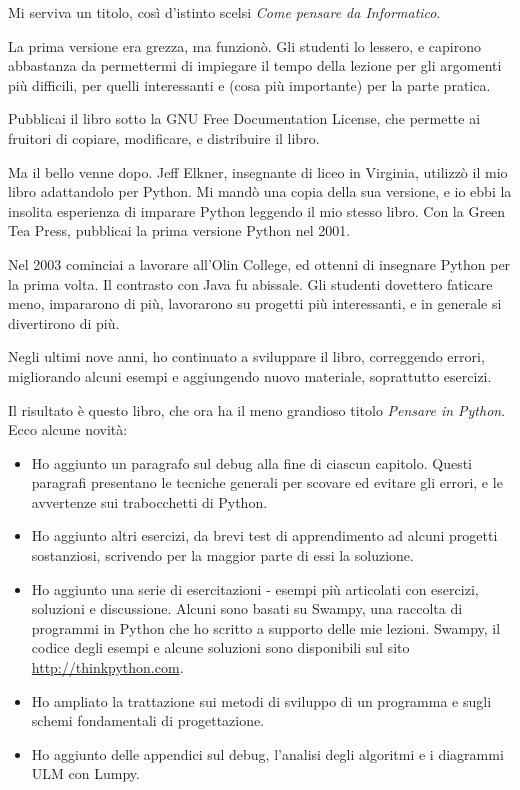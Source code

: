\documentclass[10pt]{book}
\begin{document}
Mi serviva un titolo, così d'istinto scelsi {\em Come pensare da Informatico}.

La prima versione era grezza, ma funzionò. Gli studenti lo lessero, e capirono abbastanza da permettermi di impiegare il tempo della lezione per gli argomenti più difficili, per quelli interessanti e (cosa più importante) per la parte pratica.

Pubblicai il libro sotto la GNU Free Documentation License, che permette ai fruitori di copiare, modificare, e distribuire il libro.


Ma il bello venne dopo. Jeff Elkner, insegnante di liceo in Virginia, utilizzò il mio libro adattandolo per Python. Mi mandò una copia della sua versione, e io ebbi la insolita esperienza di imparare Python leggendo il mio stesso libro. Con la Green Tea Press, pubblicai la prima versione Python nel 2001.

Nel 2003 cominciai a lavorare all'Olin College, ed ottenni di insegnare Python per la prima volta. Il contrasto con Java fu abissale. Gli studenti dovettero faticare meno, impararono di più, lavorarono su progetti più interessanti, e in generale si divertirono di più.

Negli ultimi nove anni, ho continuato a sviluppare il libro, correggendo errori, migliorando alcuni esempi e aggiungendo nuovo materiale, soprattutto esercizi.

Il risultato è questo libro, che ora ha il meno grandioso titolo 
{\em Pensare in Python}.  Ecco alcune novità:

\begin{itemize}

\item Ho aggiunto un paragrafo sul debug alla fine di ciascun capitolo. Questi paragrafi presentano le tecniche generali per scovare ed evitare gli errori, e le avvertenze sui trabocchetti di Python.

\item Ho aggiunto altri esercizi, da brevi test di apprendimento ad alcuni progetti sostanziosi, scrivendo per la maggior parte di essi la soluzione.

\item Ho aggiunto una serie di esercitazioni - esempi più articolati con esercizi, soluzioni e discussione. Alcuni sono basati su Swampy, una raccolta di programmi in Python che ho scritto a supporto delle mie lezioni. Swampy, il codice degli esempi e alcune soluzioni sono disponibili sul sito 
  \url{http://thinkpython.com}.
  
\item Ho ampliato la trattazione sui metodi di sviluppo di un programma e sugli schemi fondamentali di progettazione.

\item Ho aggiunto delle appendici sul debug, l'analisi degli algoritmi e i diagrammi ULM con Lumpy.

\end{itemize}
\end{document}
